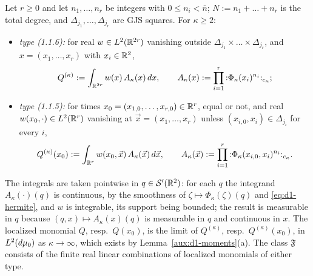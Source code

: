 \begin{auxdef}\label{aux:d1-obs}
Let $r\ge0$ and let $n_1,\dots,n_r$ be integers with $0\le n_i<\bar n$; $N:=n_1+\dots+n_r$ is
the total degree, and $\Delta_{j_1},\dots,\Delta_{j_r}$ are GJS squares. For $\kappa\ge2$:
\begin{itemize}
\item[(a)] \emph{type (1.1.6):} for real $w\in L^2(\mathbb{R}^{2r})$ vanishing outside
$\Delta_{j_1}\times\dots\times\Delta_{j_r}$, and $x=(x_1,\dots,x_r)$ with $x_i\in\mathbb{R}^2$,
\[
 Q^{(\kappa)}:=\int_{\mathbb{R}^{2r}}w(x)\,A_\kappa(x)\,dx,\qquad
 A_\kappa(x):=\prod_{i=1}^r{:}\Phi_\kappa(x_i)^{n_i}{:}_{c_\kappa} ;
\]
\item[(b)] \emph{type (1.1.5):} for times $x_0=(x_{1,0},\dots,x_{r,0})\in\mathbb{R}^r$, equal or not,
and real $w(x_0,\cdot)\in L^2(\mathbb{R}^r)$ vanishing at $\vec x=(x_1,\dots,x_r)$ unless
$(x_{i,0},x_i)\in\Delta_{j_i}$ for every $i$,
\[
 Q^{(\kappa)}(x_0):=\int_{\mathbb{R}^r}w(x_0,\vec x)\,A_\kappa(\vec x)\,d\vec x,\qquad
 A_\kappa(\vec x):=\prod_{i=1}^r{:}\Phi_\kappa(x_{i,0},x_i)^{n_i}{:}_{c_\kappa} .
\]
\end{itemize}
The integrals are taken pointwise in $q\in\mathcal S'(\mathbb{R}^2)$: for each $q$ the integrand
$A_\kappa(\cdot)(q)$ is continuous, by the smoothness of $\zeta\mapsto\Phi_\kappa(\zeta)(q)$ and
\eqref{eq:d1-hermite}, and $w$ is integrable, its support being bounded; the result is
measurable in $q$ because $(q,x)\mapsto A_\kappa(x)(q)$ is measurable in $q$ and continuous in
$x$. The localized monomial $Q$, resp.\ $Q(x_0)$, is the limit of $Q^{(\kappa)}$, resp.\
$Q^{(\kappa)}(x_0)$, in $L^2(d\mu_0)$ as $\kappa\to\infty$, which exists by
Lemma~\ref{aux:d1-moments}(a). The class $\mathfrak F$ consists of the finite real linear
combinations of localized monomials of either type.
\end{auxdef}

